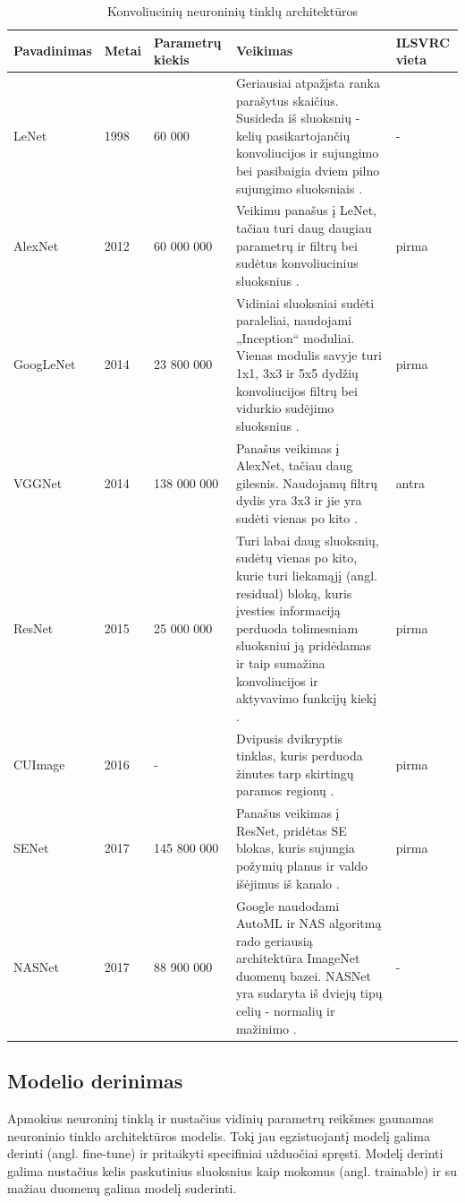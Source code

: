 \documentclass{VUMIFPSbakalaurinis}
\begin{document}
\begin{longtable}[h]{ | p{2cm} | p{1cm} | p{3cm} | p{7cm} | p{1.5cm} | } 
\caption{Konvoliucinių neuroninių tinklų architektūros} \\
\hline
Pavadinimas & Metai & Parametrų kiekis & Veikimas & ILSVRC vieta \\
\hline
\endhead
LeNet & 1998 & 60 000 & Geriausiai atpažįsta ranka parašytus skaičius. Susideda iš sluoksnių - kelių pasikartojančių konvoliucijos ir sujungimo bei pasibaigia dviem pilno sujungimo sluoksniais \cite{lecun1995comparison}. & - \\
\hline
AlexNet & 2012 & 60 000 000 & Veikimu panašus į LeNet, tačiau turi daug daugiau parametrų ir filtrų bei sudėtus konvoliucinius sluoksnius \cite{DBLP:journals/corr/abs-1803-01164}.  & pirma \\
\hline
GoogLeNet & 2014 & 23 800 000 & Vidiniai sluoksniai sudėti paraleliai, naudojami „Inception“ moduliai. Vienas modulis savyje turi 1x1, 3x3 ir 5x5 dydžių konvoliucijos filtrų bei vidurkio sudėjimo sluoksnius \cite{DBLP:journals/corr/SzegedyLJSRAEVR14}. & pirma \\
\hline
VGGNet & 2014 & 138 000 000 & Panašus veikimas į AlexNet, tačiau daug gilesnis. Naudojamų filtrų dydis yra 3x3 ir jie yra sudėti vienas po kito \cite{Simonyan2015VeryDC}. & antra \\
\hline
ResNet & 2015 & 25 000 000 & Turi labai daug sluoksnių, sudėtų vienas po kito, kurie turi liekamąjį (angl. residual) bloką, kuris įvesties informaciją perduoda tolimesniam sluoksniui ją pridėdamas ir taip sumažina konvoliucijos ir aktyvavimo funkcijų kiekį \cite{DBLP:journals/corr/TargAL16}.  & pirma \\
\hline
CUImage & 2016 & - & Dvipusis dvikryptis tinklas, kuris perduoda žinutes tarp skirtingų paramos regionų \cite{Peng2018CUImageAN}. & pirma \\
\hline
SENet & 2017 & 145 800 000 & Panašus veikimas į ResNet, pridėtas SE blokas, kuris sujungia požymių planus ir valdo išėjimus iš kanalo \cite{DBLP:journals/corr/abs-1709-01507}.  & pirma \\
\hline
NASNet & 2017 & 88 900 000 & Google naudodami AutoML ir NAS algoritmą rado geriausią architektūra ImageNet duomenų bazei. NASNet yra sudaryta iš dviejų tipų celių - normalių ir mažinimo \cite{DBLP:journals/corr/ZophVSL17}. & - \\ 
\hline
\end{longtable}

\subsection{Modelio derinimas}
Apmokius neuroninį tinklą ir nustačius vidinių parametrų reikšmes gaunamas neuroninio tinklo architektūros modelis. Tokį jau egzistuojantį modelį galima derinti (angl. fine-tune) 
ir pritaikyti specifiniai užduočiai spręsti. Modelį derinti galima nustačius kelis paskutinius sluoksnius kaip mokomus (angl. trainable) ir su mažiau duomenų galima modelį suderinti.
\end{document}
